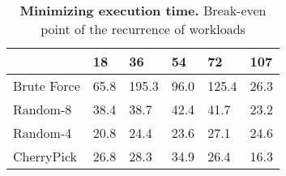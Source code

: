\begin{table}[]
\centering
\caption{\textbf{Minimizing execution time.} Break-even point of the recurrence of workloads}
\label{table:break_even_cost}
\begin{tabular}{@{}llllll@{}}
\toprule
            & 18   & 36    & 54   & 72    & 107  \\ \midrule
Brute Force & 65.8 & 195.3 & 96.0 & 125.4 & 26.3 \\
Random-8    & 38.4 & 38.7  & 42.4 & 41.7  & 23.2 \\
Random-4    & 20.8 & 24.4  & 23.6 & 27.1  & 24.6 \\
CherryPick  & 26.8 & 28.3  & 34.9 & 26.4  & 16.3 \\ \bottomrule
\end{tabular}
\end{table}